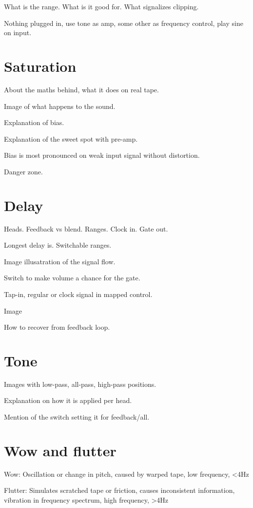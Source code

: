\documentclass[11pt]{article}
\begin{document}
What is the range. What is it good for. What signalizes clipping.

Nothing plugged in, use tone as amp, some other as frequency control, play sine on input.

\section{Saturation}

About the maths behind, what it does on real tape.

Image of what happens to the sound.

Explanation of bias.

Explanation of the sweet spot with pre-amp.

Bias is most pronounced on weak input signal without distortion.

Danger zone.

\section{Delay}

Heads. Feedback vs blend. Ranges. Clock in. Gate out.

Longest delay is. Switchable ranges.

Image illusatration of the signal flow.

Switch to make volume a chance for the gate.

Tap-in, regular or clock signal in mapped control.

Image 

How to recover from feedback loop.

\section{Tone}

Images with low-pass, all-pass, high-pass positions.

Explanation on how it is applied per head.

Mention of the switch setting it for feedback/all.

\section{Wow and flutter}

Wow: Oscillation or change in pitch, caused by warped tape, low frequency, <4Hz

Flutter: Simulates scratched tape or friction, causes inconsistent information, vibration in frequency spectrum, high frequency, >4Hz
\end{document}

